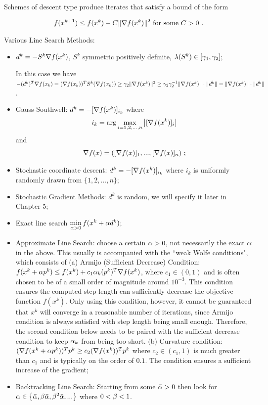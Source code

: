 Schemes of descent type produce iterates that satisfy a bound of the form

\begin{equation}\label{Eq:StandardExpansionOptimization:GeneralEstimate}
f(x^{k+1})\leq f(x^k)-C\|\grad f(x^k)\|^2 \text{ for some } C>0 \ .
\end{equation}

Various Line Search Methods: 

\begin{itemize}
\item[(1)] $d^k=-S^k \nabla f(x^k)$, $S^k$ symmetric positively definite, $\lambda(S^k)\in [\gamma_1, \gamma_2]$;

In this case we have $-(d^k)^T \nabla f(x_k)=(\nabla f(x_k))^T S^k (\nabla f(x_k))\geq \gamma_2 \|\nabla f(x^k)\|^2\geq \gamma_2\gamma_2^{-1}\|\nabla f(x^k)\|\cdot \|d^k\|=\|\nabla f(x^k)\|\cdot \|d^k\|$.

\item[(2)] Gauss-Southwell: $d^k=-[\nabla f(x^k)]_{i_k}$ where $$i_k=\arg\max\limits_{i=1,2,...,n}\left|[\nabla f(x^k)]_i\right|$$ and $$\nabla f(x) = ([\nabla f(x)]_1, ..., [\nabla f(x)]_n) \ ;$$

\item[(3)] Stochastic coordinate descent: $d^k=-[\nabla f(x^k)]_{i_k}$ where $i_k$ is uniformly randomly drawn from $\{1,2,...,n\}$; 

\item[(4)] Stochastic Gradient Methods: $d^k$ is random, we will specify it later in Chapter 5; 

\item[(5)] Exact line search $\min\limits_{\alpha>0}f(x^k+\alpha d^k)$; 

\item[(6)] Approximate Line Search: choose a certain $\alpha>0$, not necessarily the exact $\alpha$ in the above. This usually is accompanied with the ``weak Wolfe conditions", which consists of (a) Armijo (Sufficient Decrease) Condition: $f(x^k+\alpha p^k)\leq f(x^k)+c_1 \alpha_k (p^k)^T \nabla f(x^k)$, where $c_1\in (0,1)$ and is often chosen to be of a small order of magnitude around $10^{-3}$. This condition ensures the computed step length can sufficiently decrease the objective function $f(x^k)$. Only using this condition, however, it cannot be guaranteed that $x^k$
 will converge in a reasonable number of iterations, since Armijo condition is always satisfied with step length being small enough. Therefore, the second condition below needs to be paired with the sufficient decrease condition to keep $\alpha_k$
 from being too short. (b) Curvature condition: $(\nabla f(x^k+\alpha p^k))^T p^k \geq c_2 (\nabla f(x^k))^T p^k$ where $c_2\in (c_1, 1)$ is much greater than $c_1$ and is typically on the order of $0.1$. The condition ensures a sufficient increase of the gradient; 

\item[(7)] Backtracking Line Search: Starting from some $\bar{\alpha}>0$ then look for $\alpha \in \left\{\bar{\alpha}, \beta \bar{\alpha}, \beta^2\bar{\alpha}, ... \right\}$ where $0<\beta<1$.
\end{itemize}

